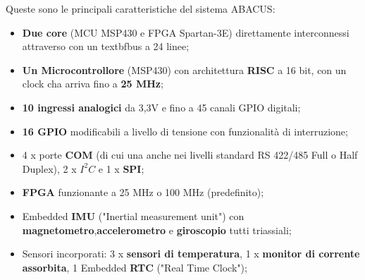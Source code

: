 \documentclass[LaM,binding=0.6cm,oneside]{../sapthesis}
\begin{document}
Queste sono le principali caratteristiche del sistema ABACUS:
\begin{itemize}
    \item \textbf{Due core} (MCU MSP430 e FPGA Spartan-3E) direttamente interconnessi attraverso con un textbf{bus a 24 linee};
    
    \item \textbf{Un Microcontrollore} (MSP430) con architettura \textbf{RISC} a 16 bit, con un clock cha arriva fino a \textbf{25 MHz};
    
    \item \textbf{10 ingressi analogici} da 3,3V e fino a 45 canali GPIO digitali;
    
    \item \textbf{16 GPIO} modificabili a livello di tensione con funzionalità di interruzione;
    
    \item 4 x porte \textbf{COM} (di cui una anche nei livelli standard RS 422/485 Full o Half Duplex), 2 x \textbf{$I^2C$} e 1 x \textbf{SPI};
    
    \item \textbf{FPGA} funzionante a 25 MHz o 100 MHz (predefinito);

    \item Embedded \textbf{IMU} ("Inertial measurement unit") con \textbf{magnetometro},\newline \textbf{accelerometro} e \textbf{giroscopio} tutti triassiali;
    
    \item Sensori incorporati: 3 x \textbf{sensori di temperatura}, 1 x \textbf{monitor di corrente assorbita}, 1 Embedded \textbf{RTC} ("Real Time Clock");
\end{itemize}
\end{document}
